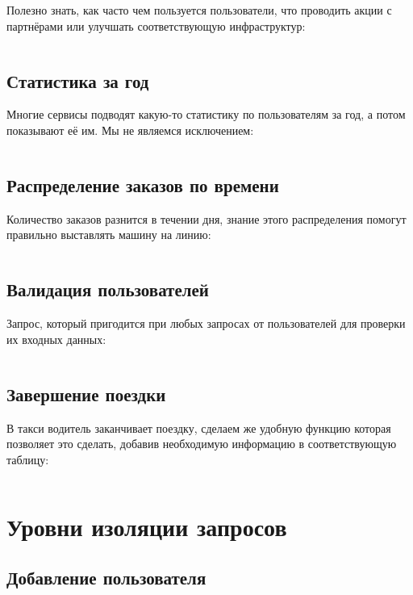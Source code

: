 \documentclass[fontsize=12pt]{article}
\begin{document}
Полезно знать, как часто чем пользуется пользователи, что проводить акции с партнёрами или улучшать соответствующую инфраструктур:

\inputminted[frame=single]{sql}{scripts/queries/payment-type-distribution.sql}

\subsection*{Статистика за год}

Многие сервисы подводят какую-то статистику по пользователям за год, а потом показывают её им. Мы не являемся исключением:

\inputminted[frame=single]{sql}{scripts/functions/user-year-statistics.sql}

\subsection*{Распределение заказов по времени}

Количество заказов разнится в течении дня, знание этого распределения помогут правильно выставлять машину на линию:

\inputminted[frame=single]{sql}{scripts/functions/rides-hour-distribution.sql}

\subsection*{Валидация пользователей}

Запрос, который пригодится при любых запросах от пользователей для проверки их входных данных:

\inputminted[frame=single]{sql}{scripts/functions/validate-user.sql}

\subsection*{Завершение поездки}

В такси водитель заканчивает поездку, сделаем же удобную функцию которая позволяет это сделать, добавив необходимую информацию в соответствующую таблицу:

\inputminted[frame=single]{sql}{scripts/functions/finish-ride.sql}

\section{Уровни изоляции запросов}

\subsection*{Добавление пользователя}
\end{document}
